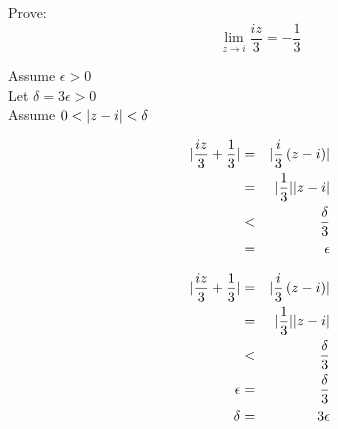 \documentclass[letterpaper,12pt,fleqn]{article}
\newcommand{\e}{\epsilon}
\renewcommand{\d}{\delta}
\begin{document}
\begin{example}
  Prove:
  \[\lim_{z\to i}\frac{iz}{3}=-\frac{1}{3}\]

  \begin{minipage}[t]{3in}
    Assume $\e>0$ \\
    Let $\d=3\e>0$ \\
    Assume $0<\abs{z-i}<\d$
    
    \begin{eqnarray*}
      \abs{\frac{iz}{3}+\frac{1}{3}} &=&
      \abs{\frac{i}{3}\left(z-i\right)} \\
      &=& \abs{\frac{1}{3}}\abs{z-i} \\
      &<& \frac{\d}{3} \\
      &=& \e \\
    \end{eqnarray*}
  \end{minipage}
  \begin{minipage}[t]{3in}
    \begin{eqnarray*}
      \abs{\frac{iz}{3}+\frac{1}{3}} &=&
      \abs{\frac{i}{3}\left(z-i\right)} \\
      &=& \abs{\frac{1}{3}}\abs{z-i} \\
      &<& \frac{\d}{3} \\
      \e &=& \frac{\d}{3} \\
      \d &=& 3\e \\
    \end{eqnarray*}
  \end{minipage}
\end{example}
\end{document}
